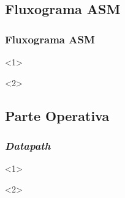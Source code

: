 \documentclass{beamer}
\begin{document}
    \subsection{Fluxograma ASM}
    \begin{frame}
        \frametitle{Fluxograma ASM}

        \begin{onlyenv}<1>
            \begin{figure}[h]
                \centering
            \end{figure}
        \end{onlyenv}

        \begin{onlyenv}<2>
          \begin{figure}[h]
            \centering
          \end{figure}
        \end{onlyenv}
    \end{frame}

    \subsection{Parte Operativa}
    \begin{frame}
        \frametitle{\textit{Datapath}}
        \begin{onlyenv}<1>
            \begin{figure}[h]
                \centering
            \end{figure}
        \end{onlyenv}

        \begin{onlyenv}<2>
          \begin{figure}[h]
            \centering
          \end{figure}
        \end{onlyenv}
    \end{frame}
\end{document}
